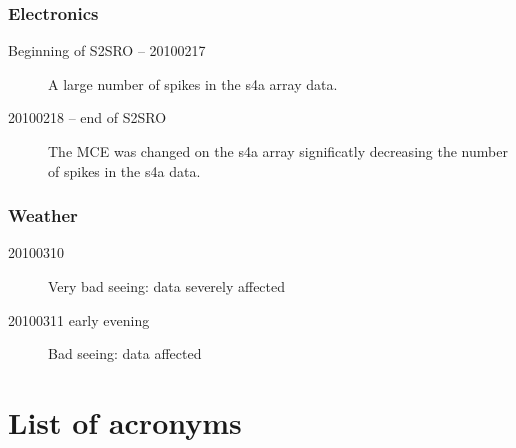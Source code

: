 \documentclass[twoside,11pt]{article}
\newcommand{\xlabel}[1]{}
\renewcommand{\_}{\texttt{\symbol{95}}}
\begin{document}
\subsubsection{Electronics}

\begin{description}

\item[Beginning of S2SRO -- 20100217] \mbox{}

  A large number of spikes in the s4a array data.

\item[20100218 -- end of S2SRO] \mbox{}

  The MCE was changed on the s4a array significatly decreasing the
  number of spikes in the s4a data.

\end{description}

\subsubsection{Weather}

\begin{description}

\item[20100310] \mbox{}

  Very bad seeing: data severely affected

\item[20100311 early evening] \mbox{}
  Bad seeing: data affected

\end{description}


\section{\xlabel{acronyms}List of acronyms}
\end{document}
